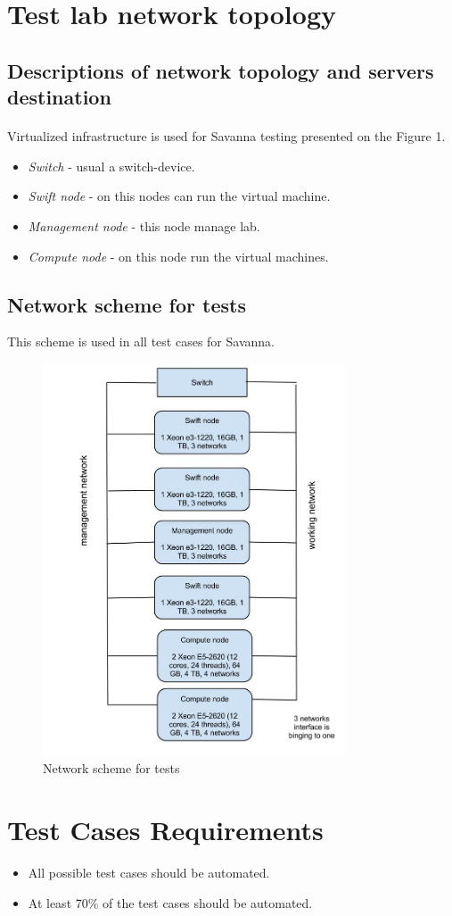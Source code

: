 \documentclass[a4paper,11pt]{article}
\begin{document}
\newpage
\section{Test lab network topology}

\subsection{Descriptions of network topology and servers destination}
\paragraph{} Virtualized infrastructure is used for Savanna testing presented on the Figure 1.
\begin{itemize}
\item \textit{Switch} - usual a switch-device.
\item \textit{Swift node} - on this nodes can run the virtual machine.
\item \textit{Management node} - this node manage lab.
\item \textit{Compute node} - on this node run the virtual machines.
\end{itemize}

\subsection{Network scheme for tests}
This scheme is used in all test cases for Savanna.

\begin{figure}[hb]
\caption{Network scheme for tests}
 \begin{center}
  \includegraphics[width=9cm]{HadoopLabSchema.jpg}
 \end{center}
\label{fig:MainScheme}
\end{figure}





\section{Test Cases Requirements}

\begin{itemize}
\item All possible test cases should be automated.
\item At least 70\% of the test cases should be automated.
\end{itemize}
\end{document}
